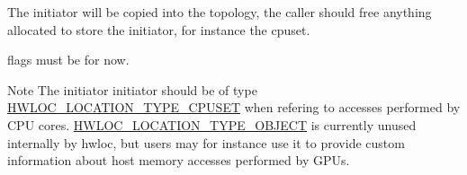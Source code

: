 The initiator will be copied into the topology, the caller should free anything allocated to store the initiator, for instance the cpuset.

{\ttfamily flags} must be {} for now.

\begin{DoxyNote}{Note}
The initiator {\ttfamily initiator} should be of type \hyperlink{a00211_gga33099ba58f607fc70925da3777688586a7135318a86361ad75fd1648e6bf6d174}{H\+W\+L\+O\+C\+\_\+\+L\+O\+C\+A\+T\+I\+O\+N\+\_\+\+T\+Y\+P\+E\+\_\+\+C\+P\+U\+S\+ET} when refering to accesses performed by C\+PU cores. \hyperlink{a00211_gga33099ba58f607fc70925da3777688586af637c39b23d48cff15ddb008644aaa84}{H\+W\+L\+O\+C\+\_\+\+L\+O\+C\+A\+T\+I\+O\+N\+\_\+\+T\+Y\+P\+E\+\_\+\+O\+B\+J\+E\+CT} is currently unused internally by hwloc, but users may for instance use it to provide custom information about host memory accesses performed by G\+P\+Us. 
\end{DoxyNote}
